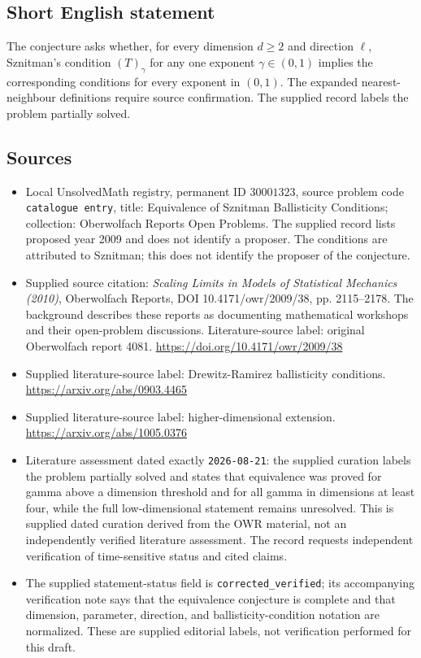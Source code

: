 \documentclass[11pt]{article}
\begin{document}
\subsection{Short English statement}
The conjecture asks whether, for every dimension \(d\geq2\) and direction \(\ell\), Sznitman's condition \((T)_\gamma\) for any one exponent \(\gamma\in(0,1)\) implies the corresponding conditions for every exponent in \((0,1)\). The expanded nearest-neighbour definitions require source confirmation. The supplied record labels the problem partially solved.
\subsection{Sources}
\begin{itemize}
\item Local UnsolvedMath registry, permanent ID \(30001323\), source problem code \texttt{catalogue entry}, title: Equivalence of Sznitman Ballisticity Conditions; collection: Oberwolfach Reports Open Problems. The supplied record lists proposed year 2009 and does not identify a proposer. The conditions are attributed to Sznitman; this does not identify the proposer of the conjecture.
\item Supplied source citation: \emph{Scaling Limits in Models of Statistical Mechanics (2010)}, Oberwolfach Reports, DOI 10.4171/owr/2009/38, pp. 2115--2178. The background describes these reports as documenting mathematical workshops and their open-problem discussions. Literature-source label: original Oberwolfach report 4081. \url{https://doi.org/10.4171/owr/2009/38}
\item Supplied literature-source label: Drewitz-Ramirez ballisticity conditions. \url{https://arxiv.org/abs/0903.4465}
\item Supplied literature-source label: higher-dimensional extension. \url{https://arxiv.org/abs/1005.0376}
\item Literature assessment dated exactly \texttt{2026-08-21}: the supplied curation labels the problem partially solved and states that equivalence was proved for gamma above a dimension threshold and for all gamma in dimensions at least four, while the full low-dimensional statement remains unresolved. This is supplied dated curation derived from the OWR material, not an independently verified literature assessment. The record requests independent verification of time-sensitive status and cited claims.
\item The supplied statement-status field is \texttt{corrected\_verified}; its accompanying verification note says that the equivalence conjecture is complete and that dimension, parameter, direction, and ballisticity-condition notation are normalized. These are supplied editorial labels, not verification performed for this draft.
\end{itemize}
\end{document}
